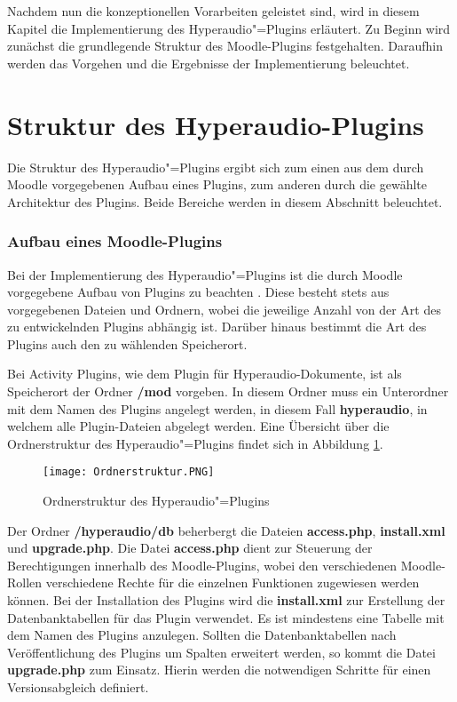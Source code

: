 Nachdem nun die konzeptionellen Vorarbeiten geleistet sind, wird in diesem Kapitel die Implementierung des Hyperaudio"=Plugins erläutert. Zu Beginn wird zunächst die grundlegende Struktur des Moodle-Plugins festgehalten. Daraufhin werden das Vorgehen und die Ergebnisse der Implementierung beleuchtet.

\section{Struktur des Hyperaudio-Plugins}
\label{sec:architektur}

Die Struktur des Hyperaudio"=Plugins ergibt sich zum einen aus dem durch Moodle vorgegebenen Aufbau eines Plugins, zum anderen durch die gewählte Architektur des Plugins. Beide Bereiche werden in diesem Abschnitt beleuchtet.

\subsubsection{Aufbau eines Moodle-Plugins}
Bei der Implementierung des Hyperaudio"=Plugins ist die durch Moodle vorgegebene Aufbau von Plugins zu beachten \citep{moodle2016activity}. Diese besteht stets aus vorgegebenen Dateien und Ordnern, wobei die jeweilige Anzahl von der Art des zu entwickelnden Plugins abhängig ist. Darüber hinaus bestimmt die Art des Plugins auch den zu wählenden Speicherort.

Bei Activity Plugins, wie dem Plugin für Hyperaudio-Dokumente, ist als Speicherort der Ordner \textbf{/mod} vorgeben. In diesem Ordner muss ein Unterordner mit dem Namen des Plugins angelegt werden, in diesem Fall \textbf{hyperaudio}, in welchem alle Plugin-Dateien abgelegt werden. Eine Übersicht über die Ordnerstruktur des Hyperaudio"=Plugins findet sich in Abbildung \ref{fig:Ordnerstruktur}.

\begin{figure}[h!]
\texttt{[image: Ordnerstruktur.PNG]}
\caption{\label{fig:Ordnerstruktur}Ordnerstruktur des Hyperaudio"=Plugins}
\end{figure}


Der Ordner \textbf{/hyperaudio/db} beherbergt die Dateien \textbf{access.php}, \textbf{install.xml} und \textbf{upgrade.php}. Die Datei \textbf{access.php} dient zur Steuerung der Berechtigungen innerhalb des Moodle-Plugins, wobei den verschiedenen Moodle-Rollen verschiedene Rechte für die einzelnen Funktionen zugewiesen werden können. Bei der Installation des Plugins wird die \textbf{install.xml} zur Erstellung der Datenbanktabellen für das Plugin verwendet. Es ist mindestens eine Tabelle mit dem Namen des Plugins anzulegen. Sollten die Datenbanktabellen nach Veröffentlichung des Plugins um Spalten erweitert werden, so kommt die Datei \textbf{upgrade.php} zum Einsatz. Hierin werden die notwendigen Schritte für einen Versionsabgleich definiert.


